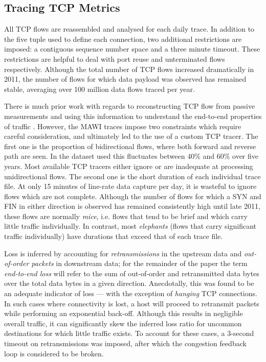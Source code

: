 \subsection{Tracing \acs{TCP} Metrics}

All \ac{TCP} flows are reassembled and analysed for each daily trace.
In addition to the five tuple used to define each connection, two additional restrictions are imposed: a contiguous sequence number space and a three minute timeout. 
These restrictions are helpful to deal with port reuse and unterminated flows respectively.  
Although the total number of \ac{TCP} flows increased dramatically in 2011, the number of flows for which data payload was observed has remained stable, averaging over 100 million data flows traced per year.  

There is much prior work with regards to reconstructing \ac{TCP} flow from passive measurements and using this information to understand the end-to-end properties of traffic \cite{firstRTT,Jaiswal:2007p233,Rewaskar:2007p195,Shakkottai:2004p408}. 
However, the \acs{MAWI} traces impose two constraints which require careful consideration, and ultimately led to the use of a custom \ac{TCP} tracer. 
The first one is the proportion of bidirectional flows, where both forward and reverse path are seen. 
In the dataset used this fluctuates between 40\% and 60\% over five years.
Most available \ac{TCP} tracers either ignore or are inadequate at processing unidirectional flows. 
The second one is the short duration of each individual trace file. 
At only 15 minutes of line-rate data capture per day, it is wasteful to ignore flows which are not complete. 
Although the number of flows for which a SYN and FIN in either direction is observed has remained consistently high until late 2011, these flows are normally \emph{mice}, i.e. flows that tend to be brief and which carry little traffic individually. 
In contrast, most \emph{elephants} (flows that carry significant traffic individually) have durations that exceed that of each trace file. 

Loss is inferred by accounting for \emph{retransmissions} in the upstream data and \emph{out-of-order packets} in downstream data; for the remainder of the paper the term \emph{end-to-end loss} will refer to the sum of out-of-order and retransmitted data bytes over the total data bytes in a given direction.
Anecdotally, this was found to be an adequate indicator of loss --- with the exception of \emph{hanging} \ac{TCP} connections. 
In such cases where connectivity is lost, a host will proceed to retransmit packets while performing an exponential back-off. 
Although this results in negligible overall traffic, it can significantly skew the inferred loss ratio for uncommon destinations for which little traffic exists. 
To account for these cases, a 3-second timeout on retransmissions was imposed, after which the congestion feedback loop is considered to be broken. 

